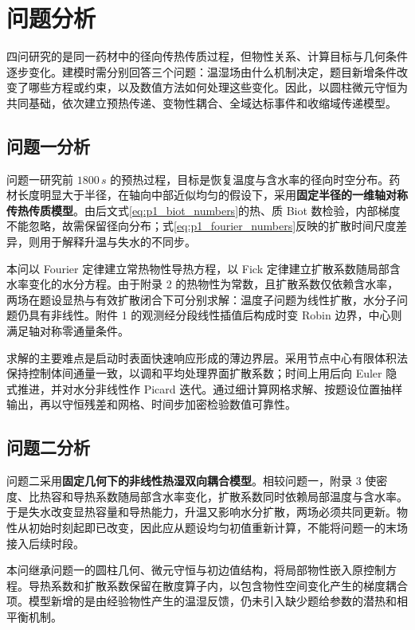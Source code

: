 \documentclass[withoutpreface,bwprint]{cumcmthesis}
\begin{document}
\section{问题分析}

四问研究的是同一药材中的径向传热传质过程，但物性关系、计算目标与几何条件逐步变化。建模时需分别回答三个问题：温湿场由什么机制决定，题目新增条件改变了哪些方程或约束，以及数值方法如何处理这些变化。因此，以圆柱微元守恒为共同基础，依次建立预热传递、变物性耦合、全域达标事件和收缩域传递模型。

\subsection{问题一分析}

问题一研究前 $1800\,\si{s}$ 的预热过程，目标是恢复温度与含水率的径向时空分布。药材长度明显大于半径，在轴向中部近似均匀的假设下，采用\textbf{固定半径的一维轴对称传热传质模型}。由后文式\eqref{eq:p1_biot_numbers}的热、质 Biot 数检验，内部梯度不能忽略，故需保留径向分布；式\eqref{eq:p1_fourier_numbers}反映的扩散时间尺度差异，则用于解释升温与失水的不同步。

本问以 Fourier 定律建立常热物性导热方程，以 Fick 定律建立扩散系数随局部含水率变化的水分方程。由于附录 2 的热物性为常数，且扩散系数仅依赖含水率，两场在题设显热与有效扩散闭合下可分别求解：温度子问题为线性扩散，水分子问题仍具有非线性。附件 1 的观测经分段线性插值后构成时变 Robin 边界，中心则满足轴对称零通量条件。

求解的主要难点是启动时表面快速响应形成的薄边界层。采用节点中心有限体积法保持控制体间通量一致，以调和平均处理界面扩散系数；时间上用后向 Euler 隐式推进，并对水分非线性作 Picard 迭代。通过细计算网格求解、按题设位置抽样输出，再以守恒残差和网格、时间步加密检验数值可靠性。

\subsection{问题二分析}

问题二采用\textbf{固定几何下的非线性热湿双向耦合模型}。相较问题一，附录 3 使密度、比热容和导热系数随局部含水率变化，扩散系数同时依赖局部温度与含水率。于是失水改变显热容量和导热能力，升温又影响水分扩散，两场必须共同更新。物性从初始时刻起即已改变，因此应从题设均匀初值重新计算，不能将问题一的末场接入后续时段。

本问继承问题一的圆柱几何、微元守恒与初边值结构，将局部物性嵌入原控制方程。导热系数和扩散系数保留在散度算子内，以包含物性空间变化产生的梯度耦合项。模型新增的是由经验物性产生的温湿反馈，仍未引入缺少题给参数的潜热和相平衡机制。
\end{document}
